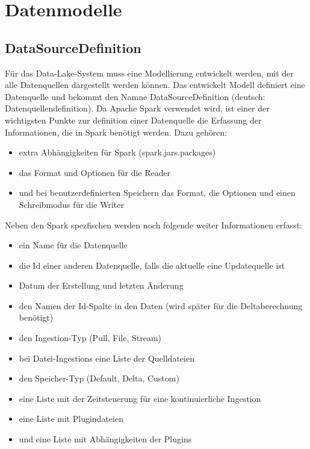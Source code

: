 \section{Datenmodelle}

\subsection{DataSourceDefinition}

Für das Data-Lake-System muss eine Modellierung entwickelt werden, mit der alle Datenquellen dargestellt werden können.
Das entwickelt Modell definiert eine Datenquelle und bekommt den Namne DataSourceDefinition (deutsch: Datenquellendefinition).
Da Apache Spark verwendet wird, ist einer der wichtigsten Punkte zur definition einer Datenquelle die Erfassung der Informationen, die in Spark benötigt werden.
Dazu gehören: \begin{itemize}
    \item extra Abhängigkeiten für Spark (spark.jars.packages)
    \item das Format und Optionen für die Reader
    \item und bei benutzerdefinierten Speichern das Format, die Optionen und einen Schreibmodus für die Writer
\end{itemize}
Neben den Spark spezfischen werden noch folgende weiter Informationen erfasst: \begin{itemize}
    \item ein Name für die Datenquelle
    \item die Id einer anderen Datenquelle, falls die aktuelle eine Updatequelle ist
    \item Datum der Erstellung und letzten Änderung
    \item den Namen der Id-Spalte in den Daten (wird später für die Deltaberechnung benötigt)
    \item den Ingestion-Typ (Pull, File, Stream)
    \item bei Datei-Ingestions eine Liste der Quelldateien
    \item den Speicher-Typ (Default, Delta, Custom)
    \item eine Liste mit der Zeitsteuerung für eine kontinuierliche Ingestion
    \item eine Liste mit Plugindateien
    \item und eine Liste mit Abhängigkeiten der Plugins
\end{itemize}

